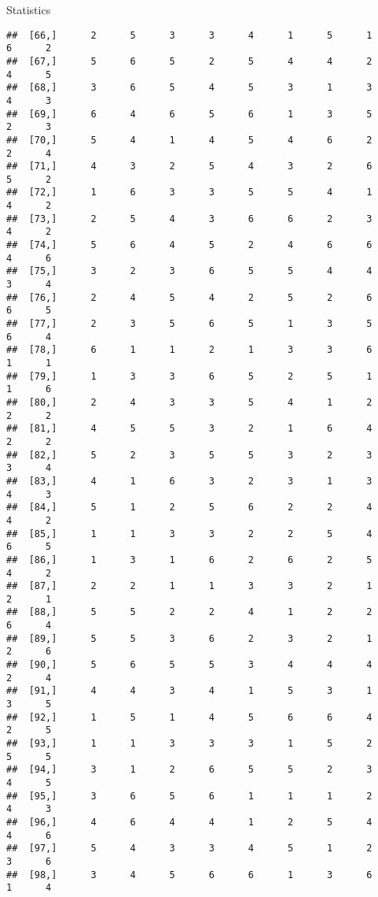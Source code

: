 \documentclass[
  ignorenonframetext,
]{beamer}
\begin{document}
\begin{frame}[fragile]{Statistics}
\begin{verbatim}
##  [66,]      2      5      3      3      4      1      5      1      6      2
##  [67,]      5      6      5      2      5      4      4      2      4      5
##  [68,]      3      6      5      4      5      3      1      3      4      3
##  [69,]      6      4      6      5      6      1      3      5      2      3
##  [70,]      5      4      1      4      5      4      6      2      2      4
##  [71,]      4      3      2      5      4      3      2      6      5      2
##  [72,]      1      6      3      3      5      5      4      1      4      2
##  [73,]      2      5      4      3      6      6      2      3      4      2
##  [74,]      5      6      4      5      2      4      6      6      4      6
##  [75,]      3      2      3      6      5      5      4      4      3      4
##  [76,]      2      4      5      4      2      5      2      6      6      5
##  [77,]      2      3      5      6      5      1      3      5      6      4
##  [78,]      6      1      1      2      1      3      3      6      1      1
##  [79,]      1      3      3      6      5      2      5      1      1      6
##  [80,]      2      4      3      3      5      4      1      2      2      2
##  [81,]      4      5      5      3      2      1      6      4      2      2
##  [82,]      5      2      3      5      5      3      2      3      3      4
##  [83,]      4      1      6      3      2      3      1      3      4      3
##  [84,]      5      1      2      5      6      2      2      4      4      2
##  [85,]      1      1      3      3      2      2      5      4      6      5
##  [86,]      1      3      1      6      2      6      2      5      4      2
##  [87,]      2      2      1      1      3      3      2      1      2      1
##  [88,]      5      5      2      2      4      1      2      2      6      4
##  [89,]      5      5      3      6      2      3      2      1      2      6
##  [90,]      5      6      5      5      3      4      4      4      2      4
##  [91,]      4      4      3      4      1      5      3      1      3      5
##  [92,]      1      5      1      4      5      6      6      4      2      5
##  [93,]      1      1      3      3      3      1      5      2      5      5
##  [94,]      3      1      2      6      5      5      2      3      4      5
##  [95,]      3      6      5      6      1      1      1      2      4      3
##  [96,]      4      6      4      4      1      2      5      4      4      6
##  [97,]      5      4      3      3      4      5      1      2      3      6
##  [98,]      3      4      5      6      6      1      3      6      1      4

\end{verbatim}
\end{frame}
\end{document}
